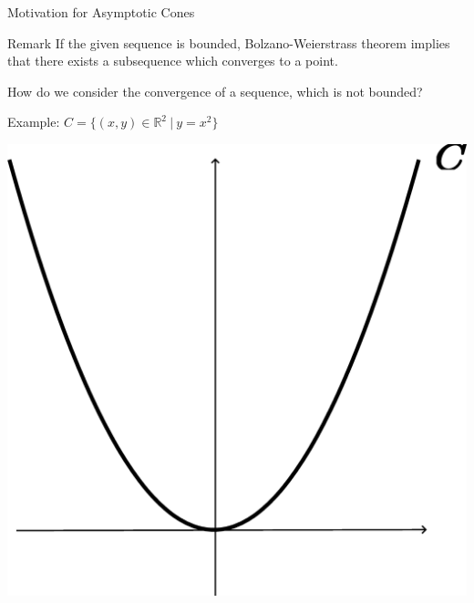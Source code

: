 \documentclass[aspectratio=169, dvipdfmx, 11pt]{beamer} %
\begin{document}
\begin{frame}{Motivation for Asymptotic Cones}
    \begin{alertblock}{Remark}
        If the given sequence is bounded, Bolzano-Weierstrass theorem implies that there exists a subsequence which converges to a point.
    \end{alertblock}

    \pause
    How do we consider the convergence of a sequence, which is not bounded?

    Example: $C = \{(x,y) \in \mathbb{R}^2 \:|\: y=x^2\}$

    \centering
    \includegraphics[keepaspectratio, scale=0.10]{figures/figure_quadratic_function.eps}
\end{frame}
\end{document}
